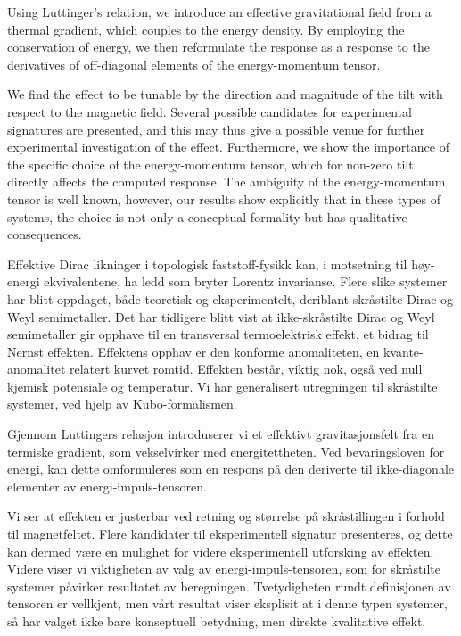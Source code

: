 Using Luttinger's relation, we introduce an effective gravitational field from a thermal gradient, which couples to the energy density.
By employing the conservation of energy, we then reformulate the response as a response to the derivatives of off-diagonal elements of the energy-momentum tensor.

We find the effect to be tunable by the direction and magnitude of the tilt with respect to the magnetic field.
Several possible candidates for experimental signatures are presented, and this may thus give a possible venue for further experimental investigation of the effect.
Furthermore, we show the importance of the specific choice of the energy-momentum tensor, which for non-zero tilt directly affects the computed response.
The ambiguity of the energy-momentum tensor is well known, however, our results show explicitly that in these types of systems, the choice is not only a conceptual formality but has qualitative consequences.

Effektive Dirac likninger i topologisk faststoff-fysikk kan, i motsetning til høy-energi ekvivalentene, ha ledd som bryter Lorentz invarianse.
Flere slike systemer har blitt oppdaget, både teoretisk og eksperimentelt, deriblant skråstilte Dirac og Weyl semimetaller.
Det har tidligere blitt vist at ikke-skråstilte Dirac og Weyl semimetaller gir opphave til en transversal  termoelektrisk effekt, et bidrag til Nernst effekten.
Effektens opphav er den konforme anomaliteten, en kvante-anomalitet relatert kurvet romtid.
Effekten består, viktig nok, også ved null kjemisk potensiale og temperatur.
Vi har generalisert utregningen til skråstilte systemer, ved hjelp av Kubo-formalismen.

Gjennom Luttingers relasjon introduserer vi et effektivt gravitasjonsfelt fra en termiske gradient, som vekselvirker med energitettheten.
Ved bevaringsloven for energi, kan dette omformuleres som en respons på den deriverte til ikke-diagonale elementer av energi-impuls-tensoren.

Vi ser at effekten er justerbar ved retning og størrelse på skråstillingen i forhold til magnetfeltet.
Flere kandidater til eksperimentell signatur presenteres, og dette kan dermed være en mulighet for videre eksperimentell utforsking av effekten.
Videre viser vi viktigheten av valg av energi-impuls-tensoren, som for skråstilte systemer påvirker resultatet av beregningen.
Tvetydigheten rundt definisjonen av tensoren er vellkjent, men vårt resultat viser eksplisit at i denne typen systemer, så har valget ikke bare konseptuell betydning, men direkte kvalitative effekt.

